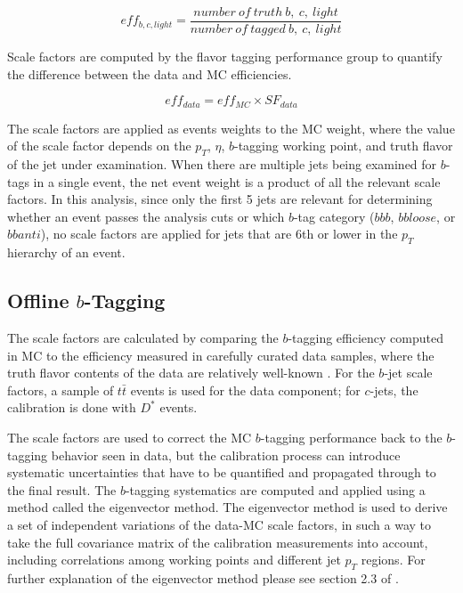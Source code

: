     \begin{equation}
        eff_{b,c,light}=\frac{number\ of\ truth\ b,\ c,\ light}{number\ of\ tagged\ b,\ c,\ light}
    \end{equation}

Scale factors are computed by the flavor tagging performance group to quantify the
difference between the data and MC efficiencies.

    \begin{equation}
        eff_{data}=eff_{MC}\times SF_{data}
    \end{equation}


The scale factors are applied as events weights to the MC weight, where the value
of the scale factor depends on the $p_T$, $\eta$, $b$-tagging working point, 
and truth flavor of the jet under examination.  
When there are multiple jets being examined for $b$-tags in a single
event, the net event weight is a product of all the relevant scale factors.
In this analysis, since only the first 5 jets are relevant for determining 
whether an event passes the analysis cuts or which $b$-tag category ($bbb$, 
$bbloose$, or $bbanti$), no scale factors are applied for jets that are 6th
or lower in the $p_T$ hierarchy of an event.

\subsection{Offline $b$-Tagging}
The scale factors are calculated by comparing the $b$-tagging efficiency computed 
in MC to the efficiency measured in carefully curated data samples, where the truth
flavor contents of the data are relatively well-known \cite{b-tagging}.  For the $b$-jet
scale factors, a sample of $t\bar{t}$ events is used for the data component; for 
$c$-jets, the calibration is done with $D^*$ events.

The scale factors are used to correct the MC $b$-tagging performance back to the $b$-tagging
behavior seen in data, but the calibration process can introduce systematic uncertainties
that have to be quantified and propagated through to the final result.  The $b$-tagging
systematics are computed and applied using a method called the eigenvector method.
The eigenvector method is used to derive a set of independent variations of the data-MC scale
factors, in such a way to take the full covariance matrix of the calibration measurements
into account, including correlations among working points and different jet $p_{T}$ regions.
For further explanation of the eigenvector method please see section 2.3 of \cite{VHBTagging}. 

